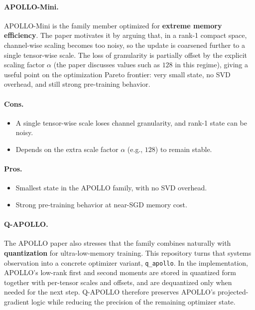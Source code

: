 \paragraph{APOLLO-Mini.}
APOLLO-Mini is the family member optimized for \textbf{extreme memory efficiency}. The paper motivates it by arguing that, in a rank-1 compact space, channel-wise scaling becomes too noisy, so the update is coarsened further to a single tensor-wise scale. The loss of granularity is partially offset by the explicit scaling factor $\alpha$ (the paper discusses values such as $128$ in this regime), giving a useful point on the optimization Pareto frontier: very small state, no SVD overhead, and still strong pre-training behavior.

\paragraph{Cons.}
\begin{itemize}[leftmargin=*]
\item A single tensor-wise scale loses channel granularity, and rank-1 state can be noisy.
\item Depends on the extra scale factor $\alpha$ (e.g., $128$) to remain stable.
\end{itemize}

\paragraph{Pros.}
\begin{itemize}[leftmargin=*]
\item Smallest state in the APOLLO family, with no SVD overhead.
\item Strong pre-training behavior at near-SGD memory cost.
\end{itemize}

\paragraph{Q-APOLLO.}
The APOLLO paper also stresses that the family combines naturally with \textbf{quantization} for ultra-low-memory training. This repository turns that systems observation into a concrete optimizer variant, \texttt{q\_apollo}. In the implementation, APOLLO's low-rank first and second moments are stored in quantized form together with per-tensor scales and offsets, and are dequantized only when needed for the next step. Q-APOLLO therefore preserves APOLLO's projected-gradient logic while reducing the precision of the remaining optimizer state.

